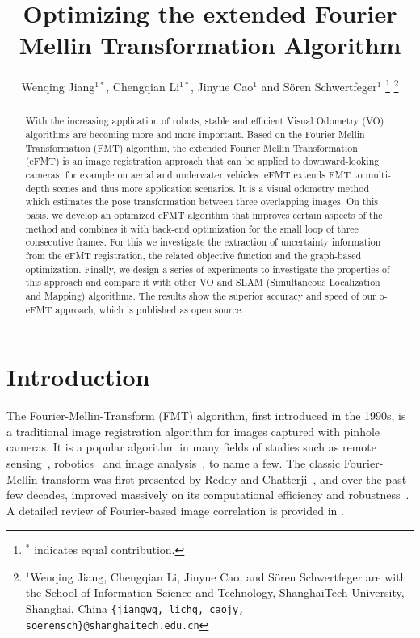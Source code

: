 \documentclass[letterpaper, 10 pt, conference]{ieeeconf}  %
\title{\LARGE \bf
Optimizing the 
extended Fourier Mellin Transformation Algorithm
}
\author{Wenqing Jiang$^{1*}$, Chengqian Li$^{1*}$, Jinyue Cao$^{1}$ and S\"{o}ren Schwertfeger$^{1}$%
\thanks{$^{*}$ indicates equal contribution.}%
\thanks{$^{1}$Wenqing Jiang, Chengqian Li, Jinyue Cao, and S\"{o}ren Schwertfeger are with the School of Information Science and Technology, ShanghaiTech University, Shanghai, China
        {\tt\small \{jiangwq, lichq, caojy, soerensch\}@shanghaitech.edu.cn}}%
}
\begin{document}
\maketitle
\thispagestyle{empty}
\pagestyle{empty}


\begin{abstract}

    With the increasing application of robots, stable and efficient Visual Odometry (VO) algorithms are becoming more and more important. Based on the Fourier Mellin Transformation (FMT) algorithm, the extended Fourier Mellin Transformation (eFMT) is an image registration approach that can be applied to downward-looking cameras, for example on aerial and underwater vehicles. eFMT extends FMT to multi-depth scenes and thus more application scenarios. It is a visual odometry method which estimates the pose transformation between three overlapping images. On this basis, we develop an optimized eFMT algorithm that improves certain aspects of the method and combines it with back-end optimization for the small loop of three consecutive frames. For this we investigate the extraction of uncertainty information from the eFMT registration, the related objective function and the graph-based optimization. Finally, we design a series of experiments to investigate the properties of this approach and compare it with other VO and SLAM (Simultaneous Localization and Mapping) algorithms. The results show the superior accuracy and speed of our o-eFMT approach, which is published as open source.

\end{abstract}


\section{Introduction}

The Fourier-Mellin-Transform (FMT) algorithm, first introduced in the 1990s, is a traditional image registration algorithm for images captured with pinhole cameras. It is a popular algorithm in many fields of studies such as remote sensing~\cite{xie2019novel}, robotics~\cite{pfingsthorn2013large} and image analysis~\cite{turski2000projective, 1562722}, to name a few. The classic Fourier-Mellin transform was first presented by Reddy and Chatterji~\cite{reddy1996fft}, and over the past few decades, improved massively on its computational efficiency and robustness~\cite{bulow2009fast,bulow2009online, DERRODE200157}. A detailed review of Fourier-based image correlation is provided in \cite{8844710}.
\end{document}
